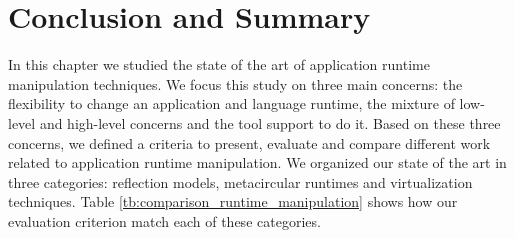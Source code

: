 


\section{Conclusion and Summary}

In this chapter we studied the state of the art of application runtime manipulation techniques. We focus this study on three main concerns: the flexibility to change an application and language runtime, the mixture of low-level and high-level concerns and the tool support to do it. Based on these three concerns, we defined a criteria to present, evaluate and compare different work related to application runtime manipulation. We organized our state of the art in three categories: reflection models, metacircular runtimes and virtualization techniques. Table \ref{tb:comparison_runtime_manipulation} shows how our evaluation criterion match each of these categories.

